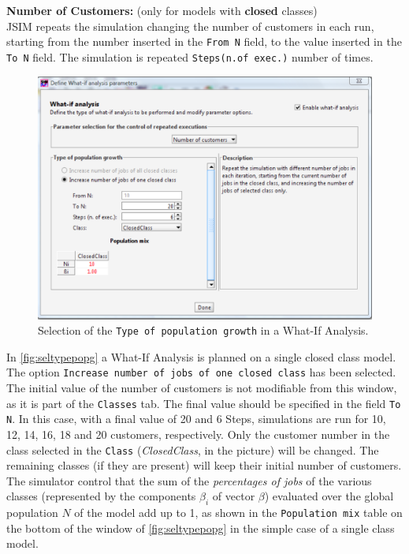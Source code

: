 \begin{itemize*}
\item \textbf{Number of Customers:} (only for models with
\textbf{closed} classes)\\
JSIM repeats the simulation changing
the number of customers in each run, starting from the number
inserted in the \texttt{From N} field, to the value inserted in
the \texttt{To N} field. The simulation is repeated
\texttt{Steps(n.of exec.)} number of times.
\begin{figure}[hbt]
    \begin{center}
        \includegraphics[scale=.5]{img/jsimg/7.3.eps}
    \end{center}
    \caption{Selection of the \texttt{Type of population growth} in
    a What-If Analysis.}
    \label{fig:seltypepopg}
\end{figure}
In \autoref{fig:seltypepopg} a What-If Analysis is planned on a
single closed class model. The option \texttt{Increase number of
jobs of one closed class} has been selected. The initial value of
the number of customers is not modifiable from this window, as it
is part of the \texttt{Classes} tab. The final value should be
specified in the field \texttt{To N}. In this case, with a final
value of 20 and 6 Steps, simulations are run for 10, 12, 14, 16,
18 and 20 customers, respectively. Only the customer number in the
class selected in the \texttt{Class} (\emph{ClosedClass}, in the
picture) will be changed. The remaining classes (if they are
present) will keep their initial number of customers. The
simulator control that the sum of the \emph{percentages of jobs}
of the various classes (represented by the components $\beta_i$ of
vector \textbf{$\beta$}) evaluated over the global population $N$
of the model add up to 1, as shown in the \texttt{Population mix}
table on the bottom of the window of \autoref{fig:seltypepopg} in
the simple case of a single class model.


\end{itemize*}
